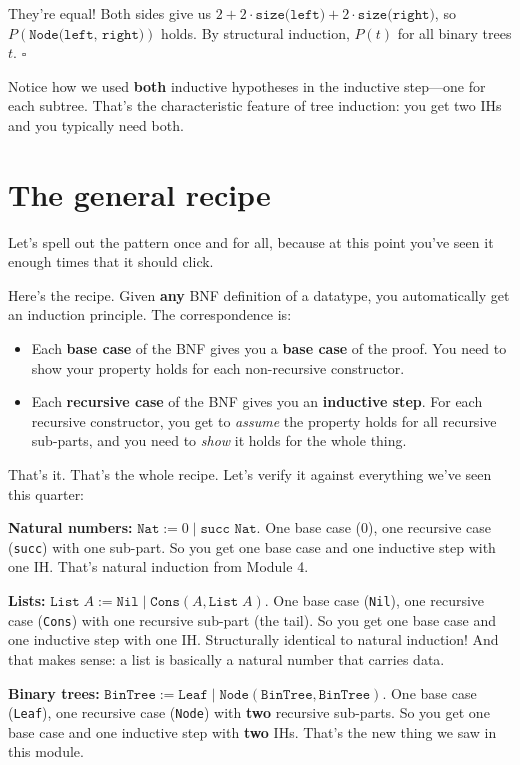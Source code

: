 \documentclass[11pt]{article}
\begin{document}
They're equal! Both sides give us $2 + 2 \cdot \texttt{size(left)} + 2 \cdot \texttt{size(right)}$, so $P(\texttt{Node(left, right)})$ holds. By structural induction, $P(t)$ for all binary trees $t$. $\square$

Notice how we used \textbf{both} inductive hypotheses in the inductive step---one for each subtree. That's the characteristic feature of tree induction: you get two IHs and you typically need both.

\section{The general recipe}

Let's spell out the pattern once and for all, because at this point you've seen it enough times that it should click.

Here's the recipe. Given \textbf{any} BNF definition of a datatype, you automatically get an induction principle. The correspondence is:

\begin{itemize}
  \item Each \textbf{base case} of the BNF gives you a \textbf{base case} of the proof. You need to show your property holds for each non-recursive constructor.
  \item Each \textbf{recursive case} of the BNF gives you an \textbf{inductive step}. For each recursive constructor, you get to \emph{assume} the property holds for all recursive sub-parts, and you need to \emph{show} it holds for the whole thing.
\end{itemize}

That's it. That's the whole recipe. Let's verify it against everything we've seen this quarter:

\textbf{Natural numbers:} $\texttt{Nat} := 0 \mid \texttt{succ Nat}$. One base case ($0$), one recursive case (\texttt{succ}) with one sub-part. So you get one base case and one inductive step with one IH. That's natural induction from Module 4.

\textbf{Lists:} $\texttt{List}\;A := \texttt{Nil} \mid \texttt{Cons}(A, \texttt{List}\;A)$. One base case (\texttt{Nil}), one recursive case (\texttt{Cons}) with one recursive sub-part (the tail). So you get one base case and one inductive step with one IH. Structurally identical to natural induction! And that makes sense: a list is basically a natural number that carries data.

\textbf{Binary trees:} $\texttt{BinTree} := \texttt{Leaf} \mid \texttt{Node}(\texttt{BinTree}, \texttt{BinTree})$. One base case (\texttt{Leaf}), one recursive case (\texttt{Node}) with \textbf{two} recursive sub-parts. So you get one base case and one inductive step with \textbf{two} IHs. That's the new thing we saw in this module.
\end{document}
